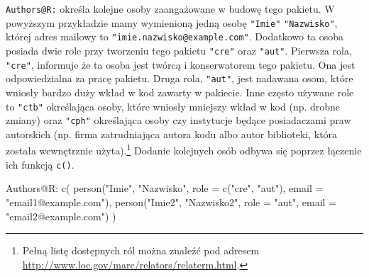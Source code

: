 \documentclass[paper=6in:9in,pagesize=pdftex,headinclude=on,footinclude=on,10pt]{scrbook}
\newenvironment{Shaded}{\begin{snugshade}}{\end{snugshade}}
\newcommand{\AttributeTok}[1]{\textcolor[rgb]{0.77,0.63,0.00}{#1}}
\newcommand{\FunctionTok}[1]{\textcolor[rgb]{0.00,0.00,0.00}{#1}}
\newcommand{\NormalTok}[1]{#1}
\newcommand{\StringTok}[1]{\textcolor[rgb]{0.31,0.60,0.02}{#1}}
\begin{document}
\texttt{Authors@R:} określa kolejne osoby zaangażowane w budowę tego pakietu.
W powyższym przykładzie mamy wymienioną jedną osobę \texttt{"Imie"} \texttt{"Nazwisko"}, której adres mailowy to \texttt{"imie.nazwisko@example.com"}.
Dodatkowo ta osoba posiada dwie role przy tworzeniu tego pakietu \texttt{"cre"} oraz \texttt{"aut"}.
Pierwsza rola, \texttt{"cre"}, informuje że ta osoba jest twórcą i konserwatorem tego pakietu.
Ona jest odpowiedzialna za pracę pakietu.
Druga rola, \texttt{"aut"}, jest nadawana osom, które wniosły bardzo duży wkład w kod zawarty w pakiecie.
Inne często używane role to \texttt{"ctb"} określająca osoby, które wniosły mniejszy wkład w kod (np. drobne zmiany) oraz \texttt{"cph"} określająca osoby czy instytucje będące posiadaczami praw autorskich (np. firma zatrudniająca autora kodu albo autor biblioteki, która została wewnętrznie użyta).\footnote{Pełną listę dostępnych ról można znaleźć pod adresem \url{http://www.loc.gov/marc/relators/relaterm.html}.}
Dodanie kolejnych osób odbywa się poprzez łączenie ich funkcją \texttt{c()}.

\begin{Shaded}
\begin{Highlighting}[]
\FunctionTok{Authors@R:}\AttributeTok{ c(}
\NormalTok{    person(}\StringTok{"Imie"}\NormalTok{, }\StringTok{"Nazwisko"}\NormalTok{, role = c(}\StringTok{"cre"}\NormalTok{, }\StringTok{"aut"}\NormalTok{), email = }\StringTok{"email1@example.com"}\NormalTok{),}
\NormalTok{    person(}\StringTok{"Imie2"}\NormalTok{, }\StringTok{"Nazwisko2"}\NormalTok{, role = }\StringTok{"aut"}\NormalTok{, email = }\StringTok{"email2@example.com"}\NormalTok{)}
\NormalTok{)}
\end{Highlighting}
\end{Shaded}
\end{document}
